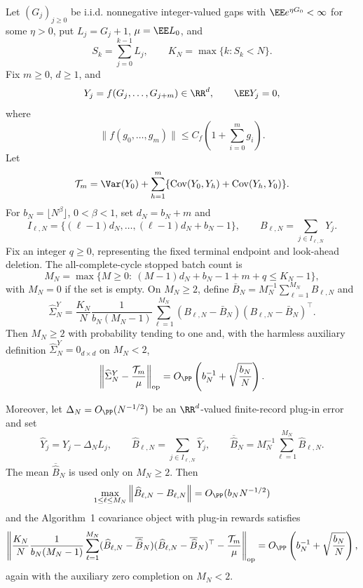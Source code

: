 \begin{proposition}\label{prop:calendar-stopped-separated-batch-plugin-main}
Let \((G_j)_{j\ge0}\) be i.i.d. nonnegative integer-valued gaps with
\(\EE e^{\eta G_0}<\infty\) for some \(\eta>0\), put
\(L_j=G_j+1\), \(\mu=\EE L_0\), and
\[
S_k=\sum_{j=0}^{k-1}L_j,\qquad
K_N=\max\{k:S_k<N\}.
\]
Fix \(m\ge0\), \(d\ge1\), and
\[
Y_j=f(G_j,\ldots,G_{j+m})\in\RR^d,\qquad
\EE Y_j=0,
\]
where
\[
\|f(g_0,\ldots,g_m)\|\le C_f\left(1+\sum_{i=0}^m g_i\right).
\]
Let
\[
\mathcal T_m=\Var(Y_0)+
\sum_{h=1}^{m}\{\operatorname{Cov}(Y_0,Y_h)+\operatorname{Cov}(Y_h,Y_0)\}.
\]
For \(b_N=\lfloor N^\beta\rfloor\), \(0<\beta<1\), set
\(d_N=b_N+m\) and
\[
I_{\ell,N}=\{(\ell-1)d_N,\ldots,(\ell-1)d_N+b_N-1\},
\qquad
B_{\ell,N}=\sum_{j\in I_{\ell,N}}Y_j .
\]
Fix an integer \(q\ge0\), representing the fixed terminal endpoint and
look-ahead deletion.  The all-complete-cycle stopped batch count is
\[
M_N=\max\{M\ge0:\ (M-1)d_N+b_N-1+m+q\le K_N-1\},
\]
with \(M_N=0\) if the set is empty.  On \(M_N\ge2\), define
\(\bar B_N=M_N^{-1}\sum_{\ell=1}^{M_N}B_{\ell,N}\) and
\[
\widehat\Sigma_N^{Y}
=
\frac{K_N}{N}\frac1{b_N(M_N-1)}
\sum_{\ell=1}^{M_N}(B_{\ell,N}-\bar B_N)
(B_{\ell,N}-\bar B_N)^\top .
\]
Then \(M_N\ge2\) with probability tending to one and, with the harmless
auxiliary definition \(\widehat\Sigma_N^{Y}=0_{d\times d}\) on \(M_N<2\),
\begin{equation}\label{eq:calendar-stopped-separated-batch-rate-main}
\left\|\widehat\Sigma_N^{Y}-\frac{\mathcal T_m}{\mu}
\right\|_{\operatorname{op}}
=O_{\PP}\left(b_N^{-1}+\sqrt{\frac{b_N}{N}}\right).
\end{equation}

Moreover, let \(\Delta_N=O_{\PP}(N^{-1/2})\) be an \(\RR^d\)-valued
finite-record plug-in error and set
\[
\widehat Y_j=Y_j-\Delta_N L_j,\qquad
\widehat B_{\ell,N}=\sum_{j\in I_{\ell,N}}\widehat Y_j,\qquad
\overline{\widehat B}_N=M_N^{-1}\sum_{\ell=1}^{M_N}\widehat B_{\ell,N}.
\]
The mean \(\overline{\widehat B}_N\) is used only on \(M_N\ge2\).
Then
\begin{equation}\label{eq:calendar-stopped-plugin-block-main}
\max_{1\le\ell\le M_N}
\left\|\widehat B_{\ell,N}-B_{\ell,N}\right\|
=O_{\PP}(b_NN^{-1/2})
\end{equation}
and the Algorithm~1 covariance object with plug-in rewards satisfies
\begin{equation}\label{eq:calendar-stopped-plugin-covariance-rate-main}
\left\|
\frac{K_N}{N}\frac1{b_N(M_N-1)}
\sum_{\ell=1}^{M_N}
(\widehat B_{\ell,N}-\overline{\widehat B}_N)
(\widehat B_{\ell,N}-\overline{\widehat B}_N)^\top
-\frac{\mathcal T_m}{\mu}
\right\|_{\operatorname{op}}
=O_{\PP}\left(b_N^{-1}+\sqrt{\frac{b_N}{N}}\right),
\end{equation}
again with the auxiliary zero completion on \(M_N<2\).
\end{proposition}

